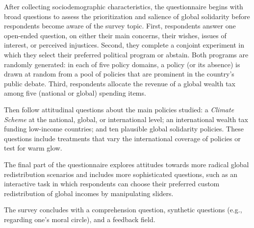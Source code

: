 \documentclass[12pt,english]{article}
\begin{document}
After collecting sociodemographic characteristics, the questionnaire begins with broad questions to assess the prioritization and salience of global solidarity before respondents become aware of the survey topic. First, respondents answer one open-ended question, on either their main concerns, their wishes, issues of interest, or perceived injustices. Second, they complete a conjoint experiment in which they select their preferred political program or abstain. Both programs are randomly generated: in each of five policy domains, a policy (or its absence) is drawn at random from a pool of policies that are prominent in the country's public debate. Third, respondents allocate the revenue of a global wealth tax among five (national or global) spending items. 

Then follow attitudinal questions about the main policies studied: a \textit{Climate Scheme} at the national, global, or international level; an international wealth tax funding low-income countries; and ten plausible global solidarity policies. These questions include treatments that vary the international coverage of policies or test for warm glow. 

The final part of the questionnaire explores attitudes towards more radical global redistribution scenarios and includes more sophisticated questions, such as an interactive task in which respondents can choose their preferred custom redistribution of global incomes by manipulating sliders. 

The survey concludes with a comprehension question, synthetic questions (e.g., regarding one's moral circle), and a feedback field.


\end{document}
